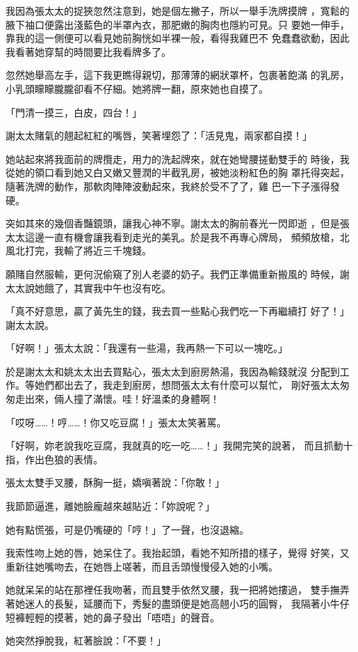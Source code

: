 我因為張太太的捉狹忽然注意到，她是個左撇子，所以一舉手洗牌摸牌
，寬鬆的腋下袖口便露出淺藍色的半罩內衣，那肥嫩的胸肉也隱約可見。只
要她一伸手，靠我的這一側便可以看見她前胸恍如半裸一般，看得我雞巴不
免蠢蠢欲動，因此我看著她穿幫的時間要比我看牌多了。

忽然她舉高左手，這下我更瞧得親切，那薄薄的網狀罩杯，包裹著飽滿
的乳房，小乳頭矇矇朧朧卻看不仔細。她將牌一翻，原來她也自摸了。

「門清一摸三，白皮，四台！」

謝太太賭氣的翹起紅紅的嘴唇，笑著埋怨了：「活見鬼，兩家都自摸！」

她站起來將我面前的牌攬走，用力的洗起牌來，就在她彎腰搓動雙手的
時後，我從她的領口看到她又白又嫩又豐潤的半截乳房，被她淡粉紅色的胸
罩托得突起，隨著洗牌的動作，那軟肉陣陣波動起來，我終於受不了了，雞
巴一下子漲得發硬。

突如其來的幾個香豔鏡頭，讓我心神不寧。謝太太的胸前春光一閃即逝
，但是張太太這邊一直有機會讓我看到走光的美乳。於是我不再專心牌局，
頻頻放槍，北風北打完，我輸了將近三千塊錢。

願賭自然服輸，更何況偷窺了別人老婆的奶子。我們正準備重新搬風的
時候，謝太太說她餓了，其實我中午也沒有吃。

「真不好意思，贏了黃先生的錢，我去買一些點心我們吃一下再繼續打
好了！」謝太太說。

「好啊！」張太太說：「我還有一些湯，我再熱一下可以一塊吃。」

於是謝太太和姚太太出去買點心，張太太到廚房熱湯，我因為輸錢就沒
分配到工作。等她們都出去了，我走到廚房，想問張太太有什麼可以幫忙，
剛好張太太匆匆走出來，倆人撞了滿懷。哇！好溫柔的身體啊！

「哎呀……！哼……！你又吃豆腐！」張太太笑著罵。

「好啊，妳老說我吃豆腐，我就真的吃一吃……！」我開完笑的說著，
而且抓動十指，作出色狼的表情。

張太太雙手叉腰，酥胸一挺，嬌嗔著說：「你敢！」

我節節逼進，離她臉龐越來越貼近：「妳說呢？」

她有點慌張，可是仍嘴硬的「哼！」了一聲，也沒退縮。

我索性吻上她的唇，她呆住了。我抬起頭，看她不知所措的樣子，覺得
好笑，又重新往她嘴吻去，在她唇上嗟著，而且舌頭慢慢侵入她的小嘴。

她就呆呆的站在那裡任我吻著，而且雙手依然叉腰，我一把將她摟過，
雙手撫弄著她迷人的長髮，延腰而下，秀髮的盡頭便是她高翹小巧的圓臀，
我隔著小牛仔短褲輕輕的摸著，她的鼻子發出「唔唔」的聲音。

她突然掙脫我，紅著臉說：「不要！」

